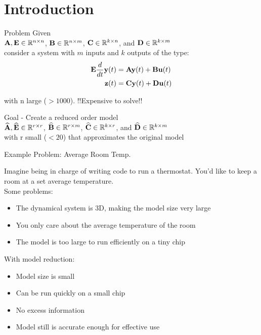 \section{Introduction}

\begin{frame}{Problem}
Given\\
\bigskip
${\mathbf A}, {\bf E} \in \mathbb{R}^{n \times n}$, ${\bf B} \in \mathbb{R}^{n \times m}$, ${\bf C} \in \mathbb{R}^{k \times n}$, and ${\bf D} \in \mathbb{R}^{k \times m}$\\
\bigskip
consider a system with $m$ inputs and $k$ outputs of the type:
\begin{align*}
            {\bf E}\frac{d}{dt} {\bf y}(t)  &= {\mathbf A} {\bf y}(t) + {\bf B}{\bf u}(t)\\
            {\bf z}(t) &= {\bf C} {\bf y}(t) + {\bf D}{\bf u}(t)
\end{align*}

with n large (\(>1000\)). !!Expensive to solve!!
\bigskip

Goal - Create a reduced order model\\
\bigskip
$\widehat {{\mathbf A}}, {\bf \widehat E} \in \mathbb{R}^{r \times r}$, ${\bf \widehat B} \in \mathbb{R}^{r \times m}$, ${\bf \widehat C} \in \mathbb{R}^{k \times r}$, and ${\bf \widehat D} \in \mathbb{R}^{k \times m}$\\
\bigskip
with r small (\(<20\)) that approximates the original model


\end{frame}

\begin{frame}{Example Problem: Average Room Temp.}

Imagine being in charge of writing code to run a thermostat. You'd like to keep a room at a set average temperature.\\
\bigskip
Some problems:
\begin{itemize}
    \item The dynamical system is 3D, making the model size very large
    \item You only care about the average temperature of the room
    \item The model is too large to run efficiently on a tiny chip
\end{itemize}
\bigskip
With model reduction:
\begin{itemize}
    \item Model size is small
    \item Can be run quickly on a small chip
    \item No excess information
    \item Model still is accurate enough for effective use
\end{itemize}

    
\end{frame}


